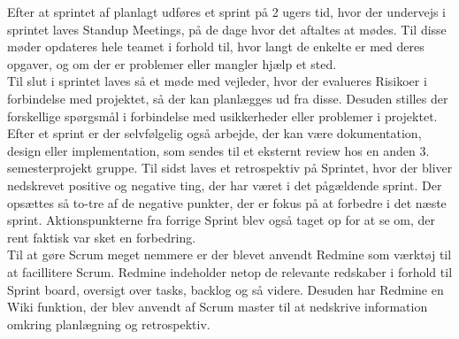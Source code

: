 \documentclass[Rapport/Rapport_main.tex]{subfiles}
\begin{document}
Efter at sprintet af planlagt udføres et sprint på 2 ugers tid, hvor der undervejs i sprintet laves Standup Meetings, på de dage hvor det aftaltes at mødes. Til disse møder opdateres hele teamet i forhold til, hvor langt de enkelte er med deres opgaver, og om der er problemer eller mangler hjælp et sted.\\
Til slut i sprintet laves så et møde med vejleder, hvor der evalueres Risikoer i forbindelse med projektet, så der kan planlægges ud fra disse. Desuden stilles der forskellige spørgsmål i forbindelse med usikkerheder eller problemer i projektet. Efter et sprint er der selvfølgelig også arbejde, der kan være dokumentation, design eller implementation, som sendes til et eksternt review hos en anden 3. semesterprojekt gruppe. Til sidst laves et retrospektiv på Sprintet, hvor der bliver nedskrevet positive og negative ting, der har været i det pågældende sprint. Der opsættes så to-tre af de negative punkter, der er fokus på at forbedre i det næste sprint. Aktionspunkterne fra forrige Sprint blev også taget op for at se om, der rent faktisk var sket en forbedring.\\
Til at gøre Scrum meget nemmere er der blevet anvendt Redmine som værktøj til at facillitere Scrum. Redmine indeholder netop de relevante redskaber i forhold til Sprint board, oversigt over tasks, backlog og så videre. Desuden har Redmine en Wiki funktion, der blev anvendt af Scrum master til at nedskrive information omkring planlægning og retrospektiv.
\end{document}
